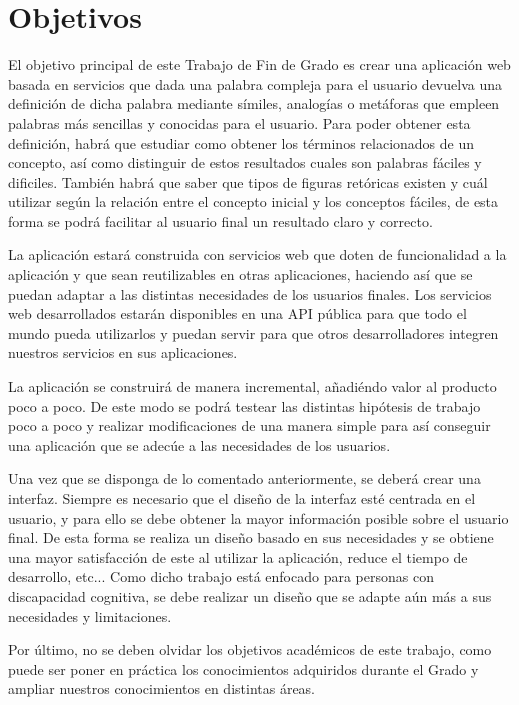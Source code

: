 \section{Objetivos}
\label{cap:sec:objetivos}

El objetivo principal de este Trabajo de Fin de Grado es crear una aplicación web basada en servicios que dada una palabra compleja para el usuario devuelva una definición de dicha palabra mediante símiles, analogías o metáforas que empleen palabras más sencillas y conocidas para el usuario. 
Para poder obtener esta definición, habrá que estudiar como obtener los términos relacionados de un concepto, así como distinguir de estos resultados cuales son palabras fáciles y dificiles. 
También habrá que saber que tipos de figuras retóricas existen y cuál utilizar según la relación entre el concepto inicial y los conceptos fáciles, de esta forma se podrá facilitar al usuario final un resultado claro y correcto.

La aplicación estará construida con servicios web que doten de funcionalidad a la aplicación y que sean reutilizables en otras aplicaciones, haciendo así que se puedan adaptar a las distintas necesidades de los usuarios finales.
Los servicios web desarrollados estarán disponibles en una API pública para que todo el mundo pueda utilizarlos y puedan servir para que otros desarrolladores integren nuestros servicios en sus aplicaciones.

La aplicación se construirá de manera incremental, añadiéndo valor al producto poco a poco. De este modo se podrá testear las distintas hipótesis de trabajo poco a poco y realizar modificaciones de una manera simple para así conseguir una aplicación que se adecúe a las necesidades de los usuarios.

Una vez que se disponga de lo comentado anteriormente, se deberá crear una interfaz. Siempre es necesario que el diseño de la interfaz esté centrada en el usuario, y para ello se debe obtener la mayor información posible sobre el usuario final. De esta forma se realiza un diseño basado en sus necesidades y se obtiene una mayor satisfacción de este al utilizar la aplicación, reduce el tiempo de desarrollo, etc...
Como dicho trabajo está enfocado para personas con discapacidad cognitiva, se debe realizar un diseño que se adapte aún más a sus necesidades y limitaciones.

Por último, no se deben olvidar los objetivos académicos de este trabajo, como puede ser poner en práctica los conocimientos adquiridos durante el Grado y ampliar nuestros conocimientos en distintas áreas. 

